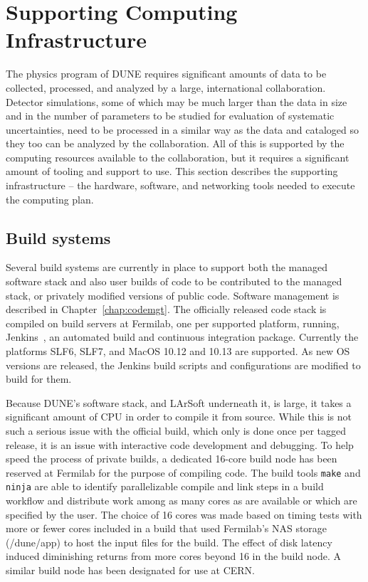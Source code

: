 %
\chapter{Supporting Computing Infrastructure} 

The physics program of DUNE requires significant amounts of data to be collected, processed,
and analyzed by a large, international collaboration.  Detector simulations, some of which may
be much larger than the data in size and in the number of parameters to be studied for evaluation
of systematic uncertainties, need to be processed in a similar way as the data and cataloged so they
too can be analyzed by the collaboration.  All of this is supported by the computing resources
available to the collaboration, but it requires a significant amount of tooling and support to
use.  This section describes the supporting infrastructure -- the hardware, software, and networking
tools needed to execute the computing plan.

\section{Build systems}

Several build systems are currently in place to support both the managed software stack and also user builds
of code to be contributed to the managed stack, or privately modified versions of public code.  Software management
is described in Chapter~\ref{chap:codemgt}.  The officially released code stack is compiled on build servers at Fermilab,
one per supported platform, running, Jenkins~\cite{jenkins}, an automated build and continuous integration
package.  Currently the platforms SLF6, SLF7, and MacOS 10.12 and 10.13 are supported.  As new OS versions are
released, the Jenkins build scripts and configurations are modified to build for them.

Because DUNE's software stack, and LArSoft underneath it, is large, it takes a significant amount of CPU in
order to compile it from source.  While this is not such a serious issue with the official build, which only
is done once per tagged release, it is an issue with interactive code development and debugging.  To help speed
the process of private builds, a dedicated 16-core build node has been reserved at Fermilab for the purpose of
compiling code.  The build tools {\tt{make}} and {\tt{ninja}} are able to identify parallelizable compile and link
steps in a build workflow and distribute work among as many cores as are available or which are specified by the
user.  The choice of 16 cores was made based on timing tests with more or fewer cores included in a build that
used Fermilab's NAS storage (/dune/app) to host the input files for the build.  The effect of disk latency induced
diminishing returns from more cores beyond 16 in the build node.  A similar build node has been designated for use
at CERN.


